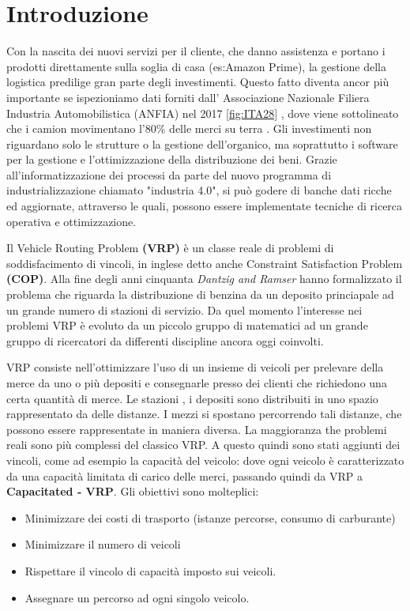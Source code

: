 \documentclass[]{article}
\begin{document}
\section{Introduzione}
Con la nascita dei nuovi servizi per il cliente, che danno assistenza e portano i prodotti direttamente sulla soglia di casa (es:Amazon Prime), la gestione della logistica predilige gran parte degli investimenti.
Questo fatto diventa ancor più importante se ispezioniamo dati forniti dall' Associazione Nazionale Filiera Industria Automobilistica (ANFIA) nel 2017 \ref{fig:ITA28} , dove viene sottolineato che i camion movimentano l'80$\%$ delle merci su terra \cite{ANFIA2017}. 
Gli investimenti non riguardano solo le strutture o la gestione dell'organico, ma soprattutto i software per la gestione e l'ottimizzazione  della distribuzione dei beni.
Grazie all'informatizzazione dei processi da parte del nuovo programma di industrializzazione chiamato "industria 4.0", si può godere di banche dati ricche ed aggiornate, attraverso le quali, possono essere implementate tecniche di ricerca operativa e ottimizzazione.

Il Vehicle Routing Problem \textbf{(VRP)}  è un classe reale di problemi di soddisfacimento di vincoli, in inglese detto anche Constraint Satisfaction Problem \textbf{(COP)}.
Alla fine degli anni cinquanta \textit{Dantzig and Ramser} hanno formalizzato il problema \cite{dispatching} che riguarda la distribuzione di benzina da un deposito princiapale ad un grande numero di stazioni di servizio.
Da quel momento l'interesse nei problemi VRP è evoluto da un piccolo gruppo di matematici ad un grande gruppo di ricercatori da differenti discipline ancora oggi coinvolti.


VRP consiste nell'ottimizzare l'uso di un insieme di veicoli per prelevare della merce da uno o più depositi e consegnarle presso dei clienti che richiedono una certa quantità di merce.
Le stazioni , i depositi sono distribuiti in uno spazio rappresentato da delle distanze. I mezzi si spostano percorrendo tali distanze, che possono essere rappresentate in maniera diversa.
La maggioranza the problemi reali sono più complessi del classico VRP. A questo quindi sono stati aggiunti dei vincoli, come ad esempio la capacità del veicolo: dove ogni veicolo è caratterizzato da una capacità limitata di carico delle merci, passando quindi da VRP a \textbf{Capacitated - VRP}.
Gli obiettivi sono molteplici:
\begin{itemize}
	\item Minimizzare dei costi di trasporto (istanze percorse, consumo di carburante)
	\item Minimizzare il numero di veicoli
	\item Rispettare il vincolo di capacità imposto  sui veicoli.
	\item Assegnare un percorso ad ogni singolo veicolo.
\end{itemize}
\end{document}
